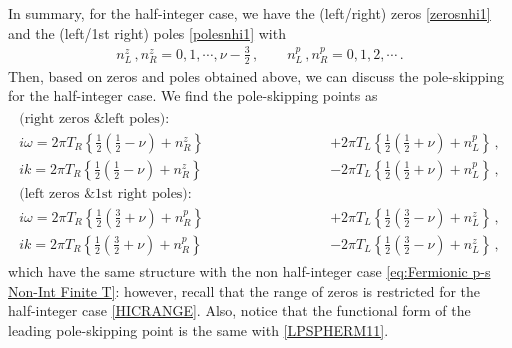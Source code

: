 \documentclass[11pt,a4paper]{article}
\begin{document}
In summary, for the half-integer case, we have the (left/right) zeros \eqref{zerosnhi1} and the (left/1st right) poles \eqref{polesnhi1} with 
\begin{align}\label{HICRANGE}
n^z_L \,, n^z_R = 0,1,\cdots, \nu-\frac{3}{2} \,,  \qquad
n^p_L \,, n^p_R = 0,1,2,\cdots \,.
\end{align}
Then, based on zeros and poles obtained above, we can discuss the pole-skipping for the half-integer case.
We find the pole-skipping points as
\begin{align}\label{eq:Fermionic p-s Int Finite T222}
\begin{split}
    \text{(right zeros \& left poles):}
\qquad\qquad\qquad\qquad\qquad \\
        i \omega = 2 \pi T_R \left\{ \frac{1}{2} \left(\frac{1}{2} - \nu \right)+n^z_R \right\} &+ 2 \pi T_L \left\{ \frac{1}{2} \left(\frac{1}{2} + \nu \right)+n^p_L \right\}\,,\\
        i k = 2 \pi T_R \left\{ \frac{1}{2} \left(\frac{1}{2} - \nu \right)+n^z_R \right\} &- 2 \pi T_L \left\{ \frac{1}{2} \left(\frac{1}{2} + \nu \right)+n^p_L \right\}\,, \\
%
\text{(left zeros \& 1st right poles):}
\qquad\qquad\qquad\qquad\qquad \\
        i \omega = 2 \pi T_R \left\{ \frac{1}{2} \left(\frac{3}{2} + \nu \right)+n^p_R \right\} &+ 2 \pi T_L \left\{ \frac{1}{2} \left(\frac{3}{2} - \nu \right)+n^z_L \right\}\,,\\
        i k = 2 \pi T_R \left\{ \frac{1}{2} \left(\frac{3}{2} + \nu \right)+n^p_R \right\} &- 2 \pi T_L \left\{ \frac{1}{2} \left(\frac{3}{2} - \nu \right)+n^z_L \right\}\,,
\end{split}
\end{align}
which have the same structure with the non half-integer case \eqref{eq:Fermionic p-s Non-Int Finite T}: however, recall that the range of zeros is restricted for the half-integer case \eqref{HICRANGE}. 
Also, notice that the functional form of the leading pole-skipping point is the same with \eqref{LPSPHERM11}.\\
\end{document}
